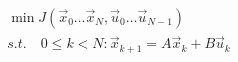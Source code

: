 \documentclass{article}
\begin{document}
\thispagestyle{empty}
$$
\begin{array}{l}
\min J(\vec{x}_0\dots\vec{x}_N,\vec{u}_0\dots\vec{u}_{N-1})\\
s.t.\quad 0\leq k < N : \vec{x}_{k+1} = A \vec{x}_k + B \vec{u}_k
\end{array}
$$
\end{document}
